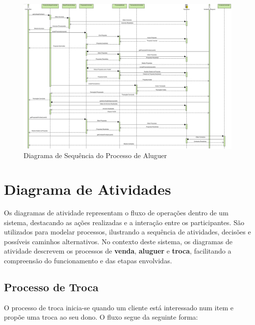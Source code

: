 \documentclass[a4paper, 12pt]{article} %
\begin{document}
\begin{figure}[ht]
	\centering
	\includegraphics[width=\textwidth]{../images/sequence-diagram-rental.png}
	\caption{Diagrama de Sequência do Processo de Aluguer}
	\label{fig:diagrama_sequencia_aluguer}
\end{figure}

\newpage
\section{Diagrama de Atividades}


Os diagramas de atividade representam o fluxo de operações dentro de um sistema, destacando as ações realizadas e a interação entre os participantes. São utilizados para modelar processos, ilustrando a sequência de atividades, decisões e possíveis caminhos alternativos. No contexto deste sistema, os diagramas de atividade descrevem os processos de \textbf{venda}, \textbf{aluguer} e \textbf{troca}, facilitando a compreensão do funcionamento e das etapas envolvidas.

\subsection{Processo de Troca}
O processo de troca inicia-se quando um cliente está interessado num item e propõe uma troca ao seu dono. O fluxo segue da seguinte forma:
\end{document}
